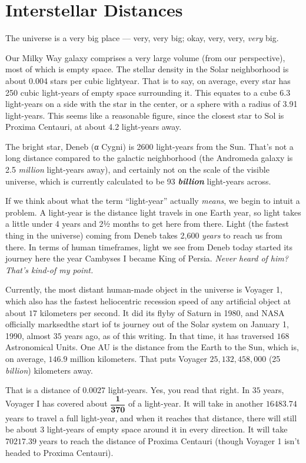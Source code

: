 \documentclass[
  letterpaper,
]{book}
\begin{document}
\chapter{Interstellar Distances}\label{interstellar-distances}

The universe is a very big place --- very, very big; okay, very, very,
\emph{very} big.

Our Milky Way galaxy comprises a very large volume (from our
perspective), most of which is empty space. The stellar density in the
Solar neighborhood is about 0.004 stars per cubic lightyear. That is to
say, on average, every star has 250 cubic light-years of empty space
surrounding it. This equates to a cube 6.3 light-years on a side with
the star in the center, or a sphere with a radius of 3.91 light-years.
This seems like a reasonable figure, since the closest star to Sol is
Proxima Centauri, at about 4.2 light-years away.

The bright star, Deneb (α Cygni) is 2600 light-years from the Sun.
That's not a long distance compared to the galactic neighborhood (the
Andromeda galaxy is 2.5 \emph{million} light-years away), and certainly
not on the scale of the visible universe, which is currently calculated
to be 93 \textbf{\emph{billion}} light-years across.

If we think about what the term ``light-year'' actually \emph{means}, we
begin to intuit a problem. A light-year is the distance light travels in
one Earth year, so light takes a little under 4 years and 2½ months to
get here from there. Light (the fastest thing in the universe) coming
from Deneb takes 2,600 \emph{years} to reach us from there. In terms of
human timeframes, light we see from Deneb today started its journey here
the year Cambyses I became King of Persia. \emph{Never heard of him?
That's kind-of my point.}

Currently, the most distant human-made object in the universe is Voyager
1, which also has the fastest heliocentric recession speed of any
artificial object at about \(17\) kilometers per second. It did its
flyby of Saturn in 1980, and NASA officially marksedthe start iof ts
journey out of the Solar system on January 1, 1990, almost \(35\) years
ago, as of this writing. In that time, it has traversed \(168\)
Astronomical Units. One AU is the distance from the Earth to the Sun,
which is, on average, \(146.9\) million kilometers. That puts Voyager
\(25,132,458,000\) (25 \emph{billion}) kilometers away.

That is a distance of \(\mathbf{0.0027}\) light-years. Yes, you read
that right. In \(35\) years, Voyager I has covered about
\(\mathbf{\dfrac{1}{370}}\) of a light-year. It will take in another
\(16483.74\) years to travel a full light-year, and when it reaches that
distance, there will still be about \(3\) light-years of empty space
around it in every direction. It will take \(70217.39\) years to reach
the distance of Proxima Centauri (though Voyager 1 isn't headed to
Proxima Centauri).
\end{document}
